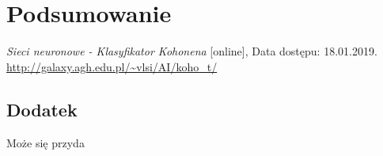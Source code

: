 \documentclass[12pt, notitlepage]{article}
\begin{document}
\section{Podsumowanie}

\newpage

\begin{thebibliography}{9}

\textit{Sieci neuronowe - Klasyfikator Kohonena} [online], Data dostępu: 18.01.2019. 
\newline\url{http://galaxy.agh.edu.pl/~vlsi/AI/koho_t/}


\end{thebibliography} 


\newpage
\setlength\parindent{24pt}
\begin{appendices}

\section{Dodatek}

Może się przyda

\end{appendices}
\end{document}
